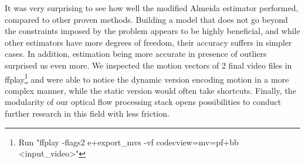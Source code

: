 \documentclass[11pt,english]{report}
\begin{document}
It was very surprising to see how well the modified Almeida estimator performed, compared to other proven methods. Building a model that does not go beyond the constraints imposed by the problem appears to be highly beneficial, and while other estimators have more degrees of freedom, their accuracy suffers in simpler cases. In addition, estimation being more accurate in presence of outliers surprised us even more. We inspected the motion vectors of 2 final video files in ffplay\footnote{Run "ffplay -flags2 e+export\_mvs -vf codecview=mv=pf+bb <input\_video>"} and were able to notice the dynamic version encoding motion in a more complex manner, while the static version would often take shortcuts. Finally, the modularity of our optical flow processing stack opens possibilities to conduct further research in this field with less friction.

\printbibliography
\end{document}

